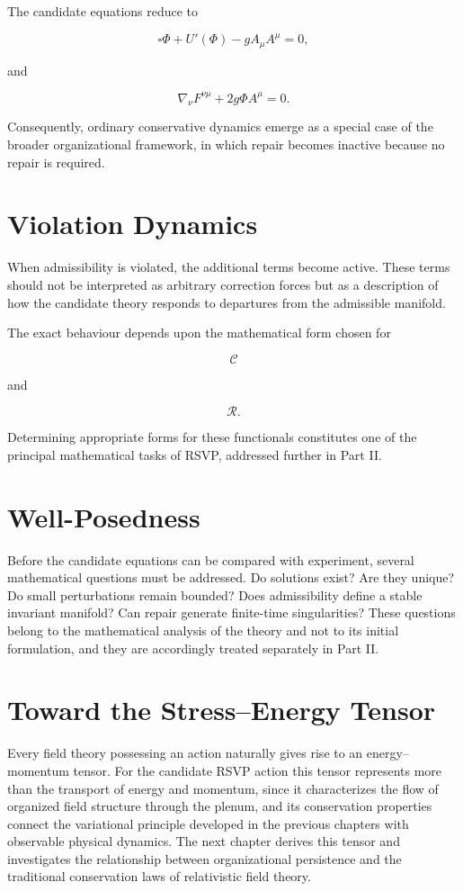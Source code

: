 \documentclass[11pt,oneside]{book}
\numberwithin{equation}{chapter}
\theoremstyle{definition}
\theoremstyle{plain}
\begin{document}
The candidate equations reduce to

\[
\square\Phi
+
U'(\Phi)
-
gA_\mu A^\mu
=
0,
\]

and

\[
\nabla_\nu
F^{\nu\mu}
+
2g\Phi A^\mu
=
0.
\]

Consequently, ordinary conservative dynamics emerge as a special case of the broader organizational framework, in which repair becomes inactive because no repair is required.

\section{Violation Dynamics}

When admissibility is violated, the additional terms become active. These terms should not be interpreted as arbitrary correction forces but as a description of how the candidate theory responds to departures from the admissible manifold.

The exact behaviour depends upon the mathematical form chosen for

\[
\mathcal C
\]

and

\[
\mathcal R.
\]

Determining appropriate forms for these functionals constitutes one of the
principal mathematical tasks of RSVP, addressed further in Part II.

\section{Well-Posedness}

Before the candidate equations can be compared with experiment, several mathematical questions must be addressed. Do solutions exist? Are they unique? Do small perturbations remain bounded? Does admissibility define a stable invariant manifold? Can repair generate finite-time singularities? These questions belong to the mathematical analysis of the theory and not to its initial formulation, and they are accordingly treated separately in Part II.

\section{Toward the Stress--Energy Tensor}

Every field theory possessing an action naturally gives rise to an energy--momentum tensor. For the candidate RSVP action this tensor represents more than the transport of energy and momentum, since it characterizes the flow of organized field structure through the plenum, and its conservation properties connect the variational principle developed in the previous chapters with observable physical dynamics. The next chapter derives this tensor and investigates the relationship between organizational persistence and the traditional conservation laws of relativistic field theory.
\end{document}
